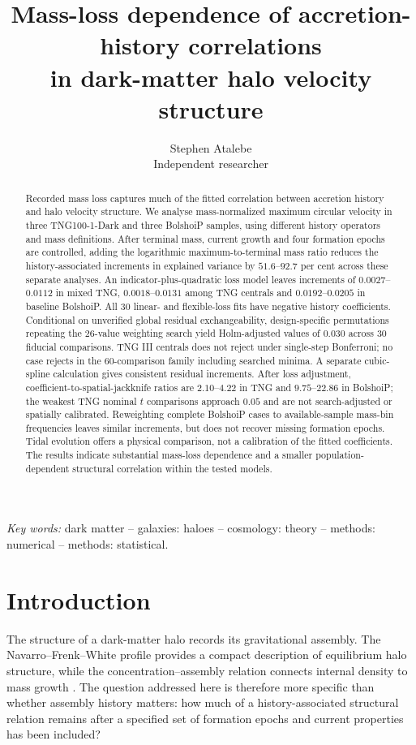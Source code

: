\documentclass[11pt,a4paper]{article}
\title{Mass-loss dependence of accretion-history correlations\\in dark-matter halo velocity structure}
\author{Stephen Atalebe\\\small Independent researcher}
\date{}
\begin{document}
\maketitle
\thispagestyle{manuscriptdoi}

\begin{abstract}
Recorded mass loss captures much of the fitted correlation between accretion history and halo velocity structure. We analyse mass-normalized maximum circular velocity in three TNG100-1-Dark and three BolshoiP samples, using different history operators and mass definitions. After terminal mass, current growth and four formation epochs are controlled, adding the logarithmic maximum-to-terminal mass ratio reduces the history-associated increments in explained variance by $51.6$--$92.7$ per cent across these separate analyses. An indicator-plus-quadratic loss model leaves increments of $0.0027$--$0.0112$ in mixed TNG, $0.0018$--$0.0131$ among TNG centrals and $0.0192$--$0.0205$ in baseline BolshoiP. All 30 linear- and flexible-loss fits have negative history coefficients. Conditional on unverified global residual exchangeability, design-specific permutations repeating the 26-value weighting search yield Holm-adjusted values of $0.030$ across 30 fiducial comparisons. TNG III centrals does not reject under single-step Bonferroni; no case rejects in the 60-comparison family including searched minima. A separate cubic-spline calculation gives consistent residual increments. After loss adjustment, coefficient-to-spatial-jackknife ratios are $2.10$--$4.22$ in TNG and $9.75$--$22.86$ in BolshoiP; the weakest TNG nominal $t$ comparisons approach $0.05$ and are not search-adjusted or spatially calibrated. Reweighting complete BolshoiP cases to available-sample mass-bin frequencies leaves similar increments, but does not recover missing formation epochs. Tidal evolution offers a physical comparison, not a calibration of the fitted coefficients. The results indicate substantial mass-loss dependence and a smaller population-dependent structural correlation within the tested models.
\end{abstract}
\noindent\textit{Key words:} dark matter -- galaxies: haloes -- cosmology: theory -- methods: numerical -- methods: statistical.

\section{Introduction}
The structure of a dark-matter halo records its gravitational assembly. The Navarro--Frenk--White profile provides a compact description of equilibrium halo structure, while the concentration--assembly relation connects internal density to mass growth \citep{NFW1997,Bullock2001,Wechsler2002}. The question addressed here is therefore more specific than whether assembly history matters: how much of a history-associated structural relation remains after a specified set of formation epochs and current properties has been included?
\end{document}
